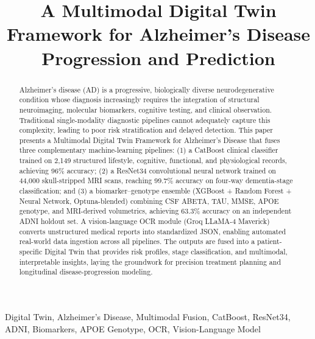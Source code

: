 \documentclass[conference]{IEEEtran}
\begin{document}
\title{A Multimodal Digital Twin Framework for Alzheimer's Disease Progression and Prediction}

\author{
}

\maketitle

\begin{abstract}
Alzheimer's disease (AD) is a progressive, biologically diverse neurodegenerative condition whose diagnosis increasingly requires the integration of structural neuroimaging, molecular biomarkers, cognitive testing, and clinical observation. Traditional single-modality diagnostic pipelines cannot adequately capture this complexity, leading to poor risk stratification and delayed detection. This paper presents a Multimodal Digital Twin Framework for Alzheimer's Disease that fuses three complementary machine-learning pipelines: (1) a CatBoost clinical classifier trained on 2{,}149 structured lifestyle, cognitive, functional, and physiological records, achieving 96\% accuracy; (2) a ResNet34 convolutional neural network trained on 44{,}000 skull-stripped MRI scans, reaching 99.7\% accuracy on four-way dementia-stage classification; and (3) a biomarker--genotype ensemble (XGBoost + Random Forest + Neural Network, Optuna-blended) combining CSF ABETA, TAU, MMSE, APOE genotype, and MRI-derived volumetrics, achieving 63.3\% accuracy on an independent ADNI holdout set. A vision-language OCR module (Groq LLaMA-4 Maverick) converts unstructured medical reports into standardized JSON, enabling automated real-world data ingestion across all pipelines. The outputs are fused into a patient-specific Digital Twin that provides risk profiles, stage classification, and multimodal, interpretable insights, laying the groundwork for precision treatment planning and longitudinal disease-progression modeling.
\end{abstract}

\begin{IEEEkeywords}
Digital Twin, Alzheimer's Disease, Multimodal Fusion, CatBoost, ResNet34, ADNI, Biomarkers, APOE Genotype, OCR, Vision-Language Model
\end{IEEEkeywords}
\end{document}
